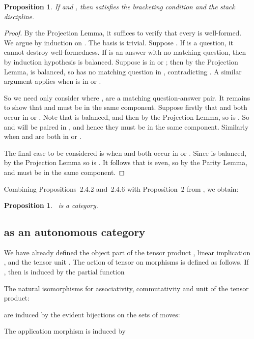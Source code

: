 \documentclass[11pt]{article}
\newtheorem{proposition}[theorem]{Proposition}
\newcommand{\Games}{\mbox{}}
\begin{document}
\begin{proposition}
If  and , then  satisfies
the bracketing condition and the stack discipline.
\end{proposition}

\begin{proof} By the Projection Lemma, it suffices to verify that
every  is well-formed. We argue by induction
on . The basis is trivial. Suppose . If  is a
question, it cannot destroy well-formedness. If  is an answer
with no matching question, then by induction hypothesis  is
balanced. Suppose  is in  or ; then by the Projection
Lemma,  is balanced, so  has no matching question
in , contradicting . A similar argument applies when  is in  or .

So we need only consider  where ,  are a matching question-answer pair.
It remains to show  that  and  must be in the same component.
Suppose firstly that  and  both occur in  or . Note that  is
balanced, and then by the Projection Lemma, so is .
So  and  will be paired in , and hence they
must be in the same component. Similarly when  and  are both in  or
.

The final case to be considered is when  and  both occur in
 or . Since  is balanced, by the Projection Lemma so is
. It follows that  is even, so by the
Parity Lemma,  and  must be in the same component. 
\end{proof}


Combining Propositions~2.4.2 and~2.4.6 with Proposition~2 from \cite{AbramskyS:gamfcm}, we obtain:

\begin{proposition}
\Games\ is a category.
\end{proposition}

\subsection{ as an autonomous category}
We have already defined the object part of the tensor product , linear implication , and the tensor unit .
The action of tensor on morphisms is defined as follows.  If , then
  is
induced by the partial function

The natural isomorphisms for associativity, commutativity and unit of the
tensor product:

are induced by the evident bijections on the sets of moves:



The application morphism  is induced by
\end{document}
